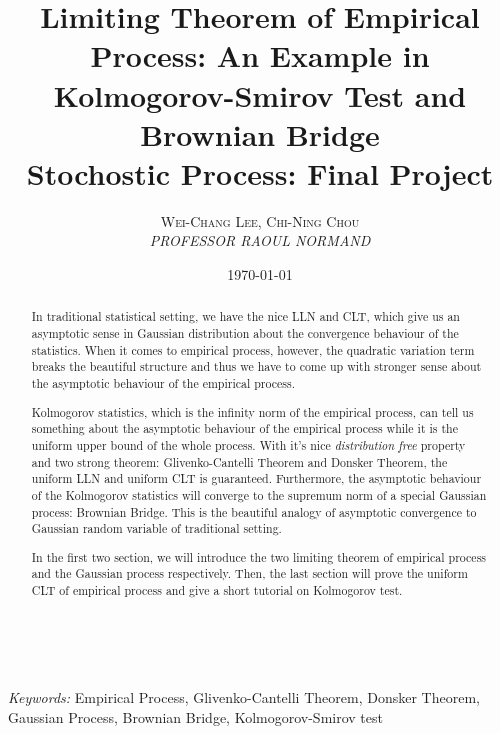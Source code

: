 \documentclass[a4paper, 11pt]{article} %
\title{\textbf{Limiting Theorem of Empirical Process: An Example in Kolmogorov-Smirov Test and Brownian Bridge}\\ %
Stochostic Process: Final Project} %
\author{\textsc{Wei-Chang Lee, Chi-Ning Chou} %
\\{\textit{PROFESSOR RAOUL NORMAND}}} %
\date{\today} %
\makeatletter
\renewcommand{\maketitle}{ %
\begin{flushright} %
{\LARGE\@title} %

\vspace{50pt} %

{\large\@author} %
\\\@date %

\vspace{40pt} %
\end{flushright}
}
\makeatother
\begin{document}
\maketitle %



\begin{abstract}
In traditional statistical setting, we have the nice LLN and CLT, which give us an asymptotic sense in Gaussian distribution about the convergence behaviour of the statistics. When it comes to empirical process, however, the quadratic variation term breaks the beautiful structure and thus we have to come up with stronger sense about the asymptotic behaviour of the empirical process.

Kolmogorov statistics, which is the infinity norm of the empirical process, can tell us something about the asymptotic behaviour of the empirical process while it is the uniform upper bound of the whole process. With it's nice {\it distribution free} property and two strong theorem: Glivenko-Cantelli Theorem and Donsker Theorem, the uniform LLN and uniform CLT is guaranteed. Furthermore, the asymptotic behaviour of the Kolmogorov statistics will converge to the supremum norm of a special Gaussian process: Brownian Bridge. This is the beautiful analogy of asymptotic convergence to Gaussian random variable of traditional setting.

In the first two section, we will introduce the two limiting theorem of empirical process and the Gaussian process respectively. Then, the last section will prove the uniform CLT of empirical process and give a short tutorial on Kolmogorov test. 


\end{abstract}

\hspace*{5,6mm}\textit{Keywords:} Empirical Process, Glivenko-Cantelli Theorem, Donsker Theorem, Gaussian Process, Brownian Bridge, Kolmogorov-Smirov test %

\vspace{30pt} %

\end{document}
